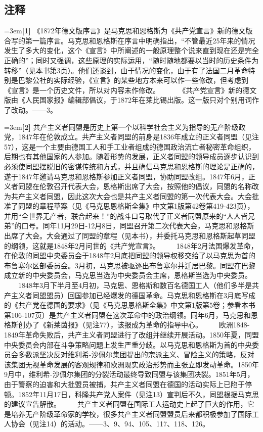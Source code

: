 \documentclass[UTF8,zihao=-4,a4paper]{ctexart}
\begin{document}
\subsection*{注释}
\noindent\hangindent=3em\textbf{[1]} 《1872年德文版序言》是马克思和恩格斯为《共产党宣言》新的德文版合写的第一篇序言。马克思和恩格斯在序言中明确指出，“不管最近25年来的情况发生了多大的变化，这个《宣言》中所阐述的一般原理整个说来直到现在还是完全正确的”；同时又强调，这些原理的实际运用，“随时随地都要以当时的历史条件为转移”（见本书第3页）。他们还谈到，由于情况的变化，由于有了法国二月革命特别是巴黎公社的实际经验，《宣言》的某些地方本来可以作一些修改，但考虑到《宣言》是一个历史文件，所以对内容未作修改。  　　 《共产党宣言》新的德文版由《人民国家报》编辑部倡议，于1872年在莱比锡出版。这一版只对个别用词作了改动。——3。\par
\noindent\hangindent=3em\textbf{[2]} 共产主义者同盟是历史上第一个以科学社会主义为指导的无产阶级政党，1847年在伦敦成立。共产主义者同盟的前身是1836年成立的正义者同盟（见注57），这是一个主要由德国工人和手工业者组成的德国政治流亡者秘密革命组织，后期也有其他国家的人参加。随着形势的发展，正义者同盟的领导成员逐步认识到必须使同盟摆脱旧的密谋传统和方式，并且确信马克思和恩格斯的理论是正确的，遂于1847年邀请马克思和恩格斯参加正义者同盟，协助同盟改组。1847年6月，正义者同盟在伦敦召开代表大会，恩格斯出席了大会，按照他的倡议，同盟的名称改为共产主义者同盟，因此这次大会也是共产主义者同盟的第一次代表大会。大会批准了同盟的章程草案（见《马克思恩格斯全集》中文第1版第42卷第419-423页），并用“全世界无产者，联合起来！”的战斗口号取代了正义者同盟原来的“人人皆兄弟”的口号。同年11月29日-12月8日，同盟召开第二次代表大会，马克思和恩格斯出席了大会。大会通过了同盟的章程（见本书），并委托马克思和恩格斯起草同盟的纲领，这就是1848年2月问世的《共产党宣言》。  　　1848年2月法国爆发革命，在伦敦的同盟中央委员会于1848年2月底把同盟的领导权移交给了以马克思为首的布鲁塞尔区部委员会。3月初，马克思被驱逐出布鲁塞尔并迁居巴黎。同盟在巴黎成立新的中央委员会，马克思当选为中央委员会主席，恩格斯当选为中央委员。  　　1848年3月下半月至4月初，马克思、恩格斯和数百名德国工人（他们多半是共产主义者同盟盟员）回国参加已经爆发的德国革命。马克思和恩格斯在3月底写成的《共产党在德国的要求》（见《马克思恩格斯全集》中文第1版第5卷；参看本书第106-107页）是共产主义者同盟在这次革命中的政治纲领。同年6月，马克思和恩格斯创办了《新莱茵报》（见注77），该报成为革命的指导中心。  　　欧洲1848-1849年革命失败后，共产主义者同盟进行了改组并继续开展活动。1850年夏，同盟中央委员会内部在斗争策略问题上发生严重分歧。以马克思和恩格斯为首的中央委员会多数派坚决反对维利希-沙佩尔集团提出的宗派主义、冒险主义的策略，反对该集团无视革命发展的客观规律和欧洲现实政治形势而主张立即发动革命。1850年9月中，维利希-沙佩尔集团的分裂活动最终导致同盟与该集团决裂。1851年5月，由于警察的迫害和大批盟员被捕，共产主义者同盟在德国的活动实际上已陷于停顿。1852年11月17日，科隆共产党人案件（见注13）宣判后不久，同盟根据马克思的建议宣告解散。  　　共产主义者同盟在国际工人运动史上起了巨大的作用，它是培养无产阶级革命家的学校，很多共产主义者同盟盟员后来都积极参加了国际工人协会（见注14）的活动。——3、9、94、105、117、118、126。\par
\end{document}
